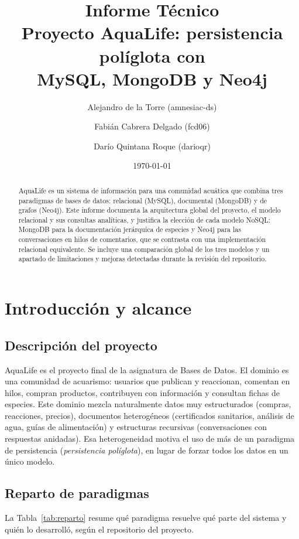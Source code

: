 \documentclass[11pt, a4paper]{article}
\title{\textbf{Informe Técnico}\\[0.4em]\Large Proyecto AquaLife: persistencia políglota con\\MySQL, MongoDB y Neo4j}
\author{Alejandro de la Torre (amnesiac-ds) \and Fabián Cabrera Delgado (fcd06) \and Darío Quintana Roque (darioqr)}
\date{\today}
\begin{document}
\maketitle
\thispagestyle{fancy}

\begin{abstract}
\noindent
AquaLife es un sistema de información para una comunidad acuática que combina tres paradigmas de bases de datos: relacional (MySQL), documental (MongoDB) y de grafos (Neo4j). Este informe documenta la arquitectura global del proyecto, el modelo relacional y sus consultas analíticas, y justifica la elección de cada modelo NoSQL: MongoDB para la documentación jerárquica de especies y Neo4j para las conversaciones en hilos de comentarios, que se contrasta con una implementación relacional equivalente. Se incluye una comparación global de los tres modelos y un apartado de limitaciones y mejoras detectadas durante la revisión del repositorio.
\end{abstract}

\tableofcontents
\newpage

\section{Introducción y alcance}

\subsection{Descripción del proyecto}
AquaLife es el proyecto final de la asignatura de Bases de Datos. El dominio es una comunidad de acuarismo: usuarios que publican y reaccionan, comentan en hilos, compran productos, contribuyen con información y consultan fichas de especies. Este dominio mezcla naturalmente datos muy estructurados (compras, reacciones, precios), documentos heterogéneos (certificados sanitarios, análisis de agua, guías de alimentación) y estructuras recursivas (conversaciones con respuestas anidadas). Esa heterogeneidad motiva el uso de más de un paradigma de persistencia (\textit{persistencia políglota}), en lugar de forzar todos los datos en un único modelo.

\subsection{Reparto de paradigmas}
La Tabla~\ref{tab:reparto} resume qué paradigma resuelve qué parte del sistema y quién lo desarrolló, según el repositorio del proyecto.
\end{document}
